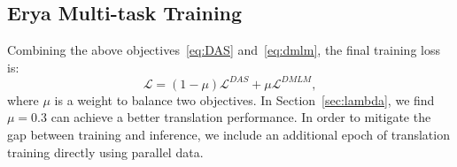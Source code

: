 

\subsection{Erya Multi-task Training}
\label{sec:mul}
Combining the above objectives~\ref{eq:DAS} and~\ref{eq:dmlm}, the final training loss is:
\begin{equation} \label{eq:combine}
    \mathcal{L} = (1-\mu) \mathcal{L}^{DAS} + \mu \mathcal{L}^{DMLM},
\end{equation}
where $\mu$ is a weight to balance two objectives. In Section~\ref{sec:lambda}, we find $\mu=0.3$ can achieve a better translation performance. In order to mitigate the gap between training and inference, we include an additional epoch of translation training directly using parallel data.




